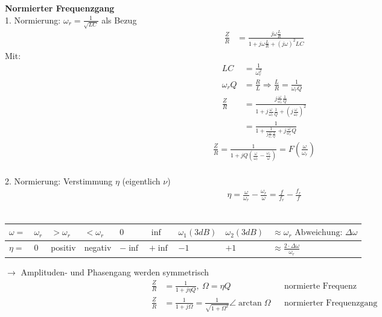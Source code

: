 \textbf{Normierter Frequenzgang}\\
1. Normierung: $\omega_r=\frac{1}{\sqrt{LC}}$ als Bezug\\
\begin{align}
	\frac{\underline{Z}}{R} &=
	\frac{j\omega\frac{L}{R}}{1+j\omega\frac{L}{R}+(j\omega)^2LC}\nonumber
\end{align}
Mit:
\begin{align}
	LC&=\frac{1}{\omega_r^2}\nonumber\\
	\omega_rQ &= \frac{R}{L} \Rightarrow \frac{L}{R}=\frac{1}{\omega_rQ}\nonumber\\
	\frac{\underline{Z}}{R} &=
	\frac{j\frac{\omega}{\omega_r}\frac{1}{Q}}{1+j\frac{\omega}{\omega_r}\frac{1}{Q}+\left(j\frac{\omega}{\omega_r}\right)^2}\nonumber\\
	&=\frac{1}{1+\frac{1}{j\frac{\omega}{\omega_r}\frac{1}{Q}}+j\frac{\omega}{\omega_r}Q}\nonumber
	\end{align}
	\begin{align}
	\boxed{\frac{\underline{Z}}{R} =
	\frac{1}{1+jQ\left(\frac{\omega}{\omega_r}-\frac{\omega_r}{\omega}\right)} =
	F\left(\frac{\omega}{\omega_r}\right)}
\end{align}\\
2. Normierung: Verstimmung $\eta$ (eigentlich $\nu$)\\
\begin{align}
	\boxed{\eta=\frac{\omega}{\omega_r}-\frac{\omega_r}{\omega}} = \frac{f}{f_r} -
	\frac{f_r}{f}
\end{align}\\
\begin{tabular}{l|l|l|l|l|l|l|l|l|}
	$\omega =$ &
	$\omega_r$ &
	$>\omega_r$ &
	$<\omega_r$ &
	$0$ &
	$\inf$ &
	$\omega_1(3dB)$ &
	$\omega_2(3dB)$ &
	$\approx\omega_r \text{ Abweichung: } \Delta\omega$	
	\\
	\hline
	$\eta =$ &
	$0$ &
	positiv &
	negativ &
	$-\inf$ &
	$+\inf$ &
	$-1$ &
	$+1$ &
	$\approx\frac{2\cdot\Delta\omega}{\omega_r}$\\	
\end{tabular}

$\rightarrow$ Amplituden- und Phasengang werden symmetrisch\\
\begin{align}
 	\frac{\underline{Z}}{R} &= \frac{1}{1+j\eta Q},\ \Omega=\eta Q
 	&&\text{normierte Frequenz}\nonumber\\
 	\frac{\underline{Z}}{R} &= \frac{1}{1+j\Omega} =
 	\frac{1}{\sqrt{1+\Omega^2}}\angle
 	\arctan{\Omega} &&\text{normierter
 	Frequenzgang}\nonumber
\end{align}

